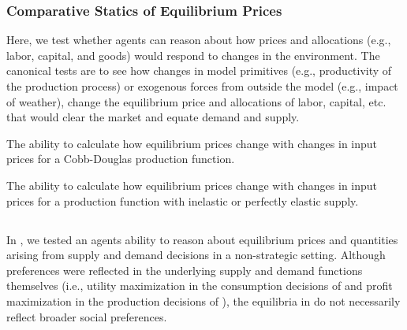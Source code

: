 \subsubsection{Comparative Statics of Equilibrium Prices}\label{mod:comparative_equilibrium}
Here, we test whether agents can reason about how prices and allocations (e.g., labor, capital, and goods) would respond to changes in the environment.  The canonical tests are to see how changes in model primitives (e.g., productivity of the production process) or exogenous forces from outside the model (e.g., impact of weather), change the equilibrium price and allocations of labor, capital, etc. that would clear the market and equate demand and supply.

\begin{el}\label{el:tfp_shocks}
    {The ability to calculate how equilibrium prices change with changes in input prices for a Cobb-Douglas production function.}
\end{el}

\begin{el}
    {The ability to calculate how equilibrium prices change with changes in input prices for a production function with inelastic or perfectly elastic supply.}
\end{el}




\subsection{\eighthParent}\label{setting:eighth}
In \seventhParent, we tested an agents ability to reason about equilibrium prices and quantities arising from supply and demand decisions in a non-strategic setting.  Although preferences were reflected in the underlying supply and demand functions themselves (i.e., utility maximization in the consumption decisions of \fifthParent and profit maximization in the production decisions of \sixthParent), the equilibria in \seventhParent do not necessarily reflect broader social preferences.

